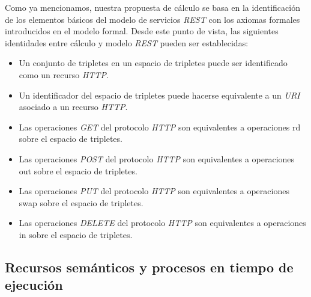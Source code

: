 Como ya mencionamos, nuestra propuesta de c\'alculo se basa en la identificaci\'on de los elementos b\'asicos del modelo de servicios \textit{REST} con los axiomas formales introducidos en el modelo formal. Desde este punto de vista, las siguientes identidades entre c\'alculo y modelo \textit{REST} pueden ser establecidas:

\begin{itemize}

\item Un conjunto de tripletes en un espacio de tripletes puede ser identificado como un recurso \textit{HTTP}.
\item Un identificador del espacio de tripletes puede hacerse equivalente a un \textit{URI} asociado a un recurso \textit{HTTP}.
\item Las operaciones \textit{GET} del protocolo \textit{HTTP} son equivalentes a operaciones rd sobre el espacio de tripletes.
\item Las operaciones \textit{POST} del protocolo \textit{HTTP} son equivalentes a operaciones out sobre el espacio de tripletes.
\item Las operaciones \textit{PUT} del protocolo \textit{HTTP} son equivalentes a operaciones swap sobre el espacio de tripletes.
\item Las operaciones \textit{DELETE} del protocolo \textit{HTTP} son equivalentes a operaciones in sobre el espacio de tripletes.

\end{itemize}

\subsection{Recursos sem\'anticos y procesos en tiempo de ejecuci\'on}

